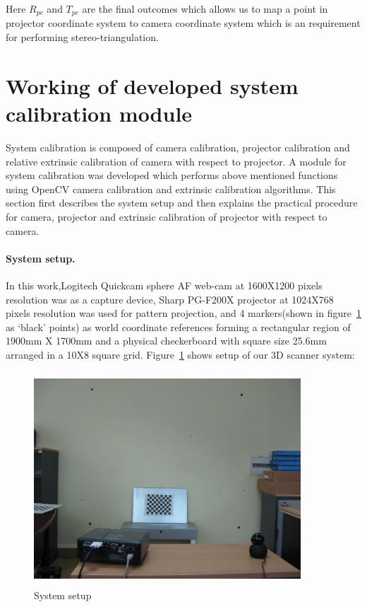 Here $R_{pc}$ and $T_{pc}$ are the final outcomes which allows us to map a point in projector coordinate system to camera coordinate system which is an requirement for performing stereo-triangulation.  
  
\section{Working of developed system calibration module}  
System calibration is composed of camera calibration, projector calibration and relative extrinsic calibration of camera with respect to projector. A module for system calibration was developed which performs above mentioned functions using OpenCV camera calibration and extrinsic calibration algorithms. This section first describes the system setup and then explains the practical procedure for camera, projector and extrinsic calibration of projector with respect to camera.  
  
\paragraph{System setup.}  
In this work,Logitech Quickcam sphere AF web-cam at 1600X1200 pixels  
resolution was as a capture device, Sharp PG-F200X projector at 1024X768 pixels resolution was used for pattern projection, and 4 markers(shown in figure~\ref{fig:calib_setup} as `black' points) as world coordinate references forming a  
rectangular region of 1900mm X 1700mm and a physical checkerboard with square  
size 25.6mm arranged in a 10X8 square grid. Figure~\ref{fig:calib_setup} shows setup of our 3D  
scanner system:\newline  
  
\begin{figure}[htbp]  
\centering  
\includegraphics[width=10cm,height=8cm]{../img_source/system_setup.jpg}  
\caption{System setup}
\label{fig:calib_setup}  
\end{figure}  
  
